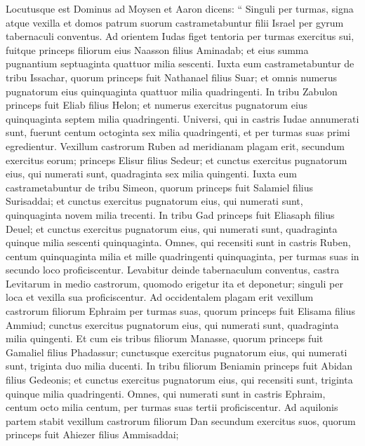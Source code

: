 \begin{biblechapter}
\begin{biblechapter}
\verse Locutusque est Dominus ad Moysen et Aaron dicens: 
\verse “ Singuli per turmas, signa atque vexilla et domos patrum suorum castrametabuntur filii Israel per gyrum tabernaculi conventus.
 \verse Ad orientem Iudas figet tentoria per turmas exercitus sui, fuitque princeps filiorum eius Naasson filius Aminadab; 
\verse et eius summa pugnantium septuaginta quattuor milia sescenti. 
\verse Iuxta eum castrametabuntur de tribu Issachar, quorum princeps fuit Nathanael filius Suar; 
\verse et omnis numerus pugnatorum eius quinquaginta quattuor milia quadringenti. 
\verse In tribu Zabulon princeps fuit Eliab filius Helon; 
\verse et numerus exercitus pugnatorum eius quinquaginta septem milia quadringenti. 
\verse Universi, qui in castris Iudae annumerati sunt, fuerunt centum octoginta sex milia quadringenti, et per turmas suas primi egredientur.
 \verse Vexillum castrorum Ruben ad meridianam plagam erit, secundum exercitus eorum; princeps Elisur filius Sedeur; 
\verse et cunctus exercitus pugnatorum eius, qui numerati sunt, quadraginta sex milia quingenti. 
\verse Iuxta eum castrametabuntur de tribu Simeon, quorum princeps fuit Salamiel filius Surisaddai; 
\verse et cunctus exercitus pugnatorum eius, qui numerati sunt, quinquaginta novem milia trecenti. 
\verse In tribu Gad princeps fuit Eliasaph filius Deuel; 
\verse et cunctus exercitus pugnatorum eius, qui numerati sunt, quadraginta quinque milia sescenti quinquaginta. 
\verse Omnes, qui recensiti sunt in castris Ruben, centum quinquaginta milia et mille quadringenti quinquaginta, per turmas suas in secundo loco proficiscentur.
 \verse Levabitur deinde tabernaculum conventus, castra Levitarum in medio castrorum, quomodo erigetur ita et deponetur; singuli per loca et vexilla sua proficiscentur.
 \verse Ad occidentalem plagam erit vexillum castrorum filiorum Ephraim per turmas suas, quorum princeps fuit Elisama filius Ammiud; 
\verse cunctus exercitus pugnatorum eius, qui numerati sunt, quadraginta milia quingenti. 
\verse Et cum eis tribus filiorum Manasse, quorum princeps fuit Gamaliel filius Phadassur; 
 \verse cunctusque exercitus pugnatorum eius, qui numerati sunt, triginta duo milia ducenti. 
\verse In tribu filiorum Beniamin princeps fuit Abidan filius Gedeonis; 
 \verse et cunctus exercitus pugnatorum eius, qui recensiti sunt, triginta quinque milia quadringenti. 
\verse Omnes, qui numerati sunt in castris Ephraim, centum octo milia centum, per turmas suas tertii proficiscentur.
 \verse Ad aquilonis partem stabit vexillum castrorum filiorum Dan secundum exercitus suos, quorum princeps fuit Ahiezer filius Ammisaddai; 

\end{biblechapter}
\end{biblechapter}
